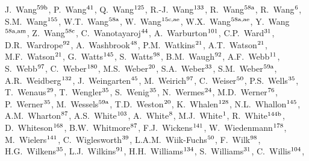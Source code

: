 \begin{flushleft}
J.~Wang$^\textrm{\scriptsize 59b}$,    
P.~Wang$^\textrm{\scriptsize 41}$,    
Q.~Wang$^\textrm{\scriptsize 125}$,    
R.-J.~Wang$^\textrm{\scriptsize 133}$,    
R.~Wang$^\textrm{\scriptsize 58a}$,    
R.~Wang$^\textrm{\scriptsize 6}$,    
S.M.~Wang$^\textrm{\scriptsize 155}$,    
W.T.~Wang$^\textrm{\scriptsize 58a}$,    
W.~Wang$^\textrm{\scriptsize 15c,ae}$,    
W.X.~Wang$^\textrm{\scriptsize 58a,ae}$,    
Y.~Wang$^\textrm{\scriptsize 58a,am}$,    
Z.~Wang$^\textrm{\scriptsize 58c}$,    
C.~Wanotayaroj$^\textrm{\scriptsize 44}$,    
A.~Warburton$^\textrm{\scriptsize 101}$,    
C.P.~Ward$^\textrm{\scriptsize 31}$,    
D.R.~Wardrope$^\textrm{\scriptsize 92}$,    
A.~Washbrook$^\textrm{\scriptsize 48}$,    
P.M.~Watkins$^\textrm{\scriptsize 21}$,    
A.T.~Watson$^\textrm{\scriptsize 21}$,    
M.F.~Watson$^\textrm{\scriptsize 21}$,    
G.~Watts$^\textrm{\scriptsize 145}$,    
S.~Watts$^\textrm{\scriptsize 98}$,    
B.M.~Waugh$^\textrm{\scriptsize 92}$,    
A.F.~Webb$^\textrm{\scriptsize 11}$,    
S.~Webb$^\textrm{\scriptsize 97}$,    
C.~Weber$^\textrm{\scriptsize 180}$,    
M.S.~Weber$^\textrm{\scriptsize 20}$,    
S.A.~Weber$^\textrm{\scriptsize 33}$,    
S.M.~Weber$^\textrm{\scriptsize 59a}$,    
A.R.~Weidberg$^\textrm{\scriptsize 132}$,    
J.~Weingarten$^\textrm{\scriptsize 45}$,    
M.~Weirich$^\textrm{\scriptsize 97}$,    
C.~Weiser$^\textrm{\scriptsize 50}$,    
P.S.~Wells$^\textrm{\scriptsize 35}$,    
T.~Wenaus$^\textrm{\scriptsize 29}$,    
T.~Wengler$^\textrm{\scriptsize 35}$,    
S.~Wenig$^\textrm{\scriptsize 35}$,    
N.~Wermes$^\textrm{\scriptsize 24}$,    
M.D.~Werner$^\textrm{\scriptsize 76}$,    
P.~Werner$^\textrm{\scriptsize 35}$,    
M.~Wessels$^\textrm{\scriptsize 59a}$,    
T.D.~Weston$^\textrm{\scriptsize 20}$,    
K.~Whalen$^\textrm{\scriptsize 128}$,    
N.L.~Whallon$^\textrm{\scriptsize 145}$,    
A.M.~Wharton$^\textrm{\scriptsize 87}$,    
A.S.~White$^\textrm{\scriptsize 103}$,    
A.~White$^\textrm{\scriptsize 8}$,    
M.J.~White$^\textrm{\scriptsize 1}$,    
R.~White$^\textrm{\scriptsize 144b}$,    
D.~Whiteson$^\textrm{\scriptsize 168}$,    
B.W.~Whitmore$^\textrm{\scriptsize 87}$,    
F.J.~Wickens$^\textrm{\scriptsize 141}$,    
W.~Wiedenmann$^\textrm{\scriptsize 178}$,    
M.~Wielers$^\textrm{\scriptsize 141}$,    
C.~Wiglesworth$^\textrm{\scriptsize 39}$,    
L.A.M.~Wiik-Fuchs$^\textrm{\scriptsize 50}$,    
F.~Wilk$^\textrm{\scriptsize 98}$,    
H.G.~Wilkens$^\textrm{\scriptsize 35}$,    
L.J.~Wilkins$^\textrm{\scriptsize 91}$,    
H.H.~Williams$^\textrm{\scriptsize 134}$,    
S.~Williams$^\textrm{\scriptsize 31}$,    
C.~Willis$^\textrm{\scriptsize 104}$,    

\end{flushleft}
